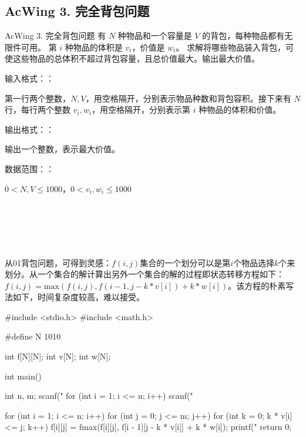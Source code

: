 \subsection{AcWing 3. 完全背包问题}
\begin{titledbox}{AcWing 3. 完全背包问题}
    有 $N$ 种物品和一个容量是 $V$ 的背包，每种物品都有无限件可用。 第 $i$ 种物品的体积是 $v_i$，价值是 $w_i$。 求解将哪些物品装入背包，可使这些物品的总体积不超过背包容量，且总价值最大。输出最大价值。

    输入格式：：

    第一行两个整数，$N, V$，用空格隔开，分别表示物品种数和背包容积。接下来有 $N$ 行，每行两个整数 $v_i, w_i$，用空格隔开，分别表示第 $i$ 种物品的体积和价值。

    输出格式：：

    输出一个整数，表示最大价值。

    数据范围：：

    $0  < N, V \le 1000$，$0  < v_i, w_i \le 1000$

    \begin{inputblock}
         \\
         \\
         \\
         \\
    \end{inputblock}
    \begin{outputblock}
    \end{outputblock}
\end{titledbox}
从01背包问题，可得到灵感：$f(i, j)$集合的一个划分可以是第$i$个物品选择$k$个来划分。从一个集合的解计算出另外一个集合的解的过程即状态转移方程如下：$f(i, j) = \text{max}(f(i, j), f(i - 1, j - k * v[i]) + k * w[i])$。该方程的朴素写法如下，时间复杂度较高，难以接受。
\begin{mycpptwocol}
    #include <stdio.h>
    #include <math.h>

    #define N 1010

    int f[N][N];
    int v[N];
    int w[N];

    int main() {
        int n, m;
        scanf("%
        for (int i = 1; i <= n; i++) {
            scanf("%
        }
        
        for (int i = 1; i <= n; i++) {
            for (int j = 0; j <= m; j++) {
                for (int k = 0; k * v[i] <= j; k++) {
                    f[i][j] = fmax(f[i][j], f[i - 1][j - k * v[i]] + k * w[i]);
                }
            }
        }
        printf("%
        return 0;
    }
\end{mycpptwocol}

